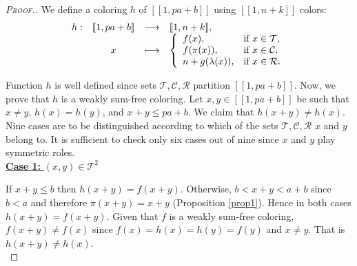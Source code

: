 \begin{proof}[\textsc{Proof.}]
We define a coloring \(h\) of \([\![1, p a + b]\!]\) using \( [\![1,n+k]\!]\) colors:
\[
\begin{array}{c c c l}
	h : & [\![1, p a + b]\!] & \longrightarrow & [\![1,n+k]\!],\\
	& x & \longmapsto &
	\left\{ \begin{array}{l l}
		f(x), & \text{if}~x \in \mathcal{T}, \\
		f(\pi(x)), & \text{if}~x \in \mathcal{C}, \\
		n + g(\lambda(x)), & \text{if}~x \in \mathcal{R}.
	\end{array} \right.
\end{array}
\]

Function \(h\) is well defined since sets \(\mathcal{T}, \mathcal{C}, \mathcal{R}\) partition \([\![1, p a + b]\!]\).
Now, we prove that \(h\) is a weakly sum-free coloring. Let \(x,y \in [\![1, p a + b]\!]\) be such that \(x \neq y\),
\(h(x) = h(y)\), and \(x+y \leqslant p a+ b\). We claim that \(h(x+y) \neq h(x)\). Nine cases are to be distinguished
according to which of the sets \(\mathcal{T}, \mathcal{C}, \mathcal{R}\) \(x\) and \(y\) belong to. It is
sufficient to check only six cases out of nine since \(x\) and \(y\) play symmetric roles. \\

\noindent \underline{\textbf{Case 1:} \((x,y) \in \mathcal{T}^2\)}
\par
If \(x + y \leqslant b\) then \(h(x+y)=f(x+y)\). Otherwise, \(b < x+y < a+b\) since \(b < a\) and
therefore \(\pi(x + y) = x +y\) (Proposition \ref{prop1}). Hence in both cases \(h(x+y)=f(x+y)\). Given that
\(f\) is a weakly sum-free coloring, \(f(x + y) \neq f(x)\) since \(f(x)=h(x)=h(y)=f(y)\) and \(x \neq y \). That
is \(h(x + y) \neq h(x)\). \\


\end{proof}
